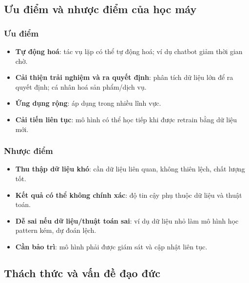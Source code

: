 \subsection{Ưu điểm và nhược điểm của học máy}

\subsubsection{Ưu điểm}
\begin{phuongphap}[title={Advantages of Machine Learning}]
\begin{itemize}
  \item \textbf{Tự động hoá}: tác vụ lặp có thể tự động hoá; ví dụ chatbot giảm thời gian chờ.
  \item \textbf{Cải thiện trải nghiệm và ra quyết định}: phân tích dữ liệu lớn để ra quyết định; cá nhân hoá sản phẩm/dịch vụ.
  \item \textbf{Ứng dụng rộng}: áp dụng trong nhiều lĩnh vực.
  \item \textbf{Cải tiến liên tục}: mô hình có thể học tiếp khi được retrain bằng dữ liệu mới.
\end{itemize}
\end{phuongphap}

\subsubsection{Nhược điểm}
\begin{phuongphap}[title={Disadvantages of Machine Learning}]
\begin{itemize}
  \item \textbf{Thu thập dữ liệu khó}: cần dữ liệu liên quan, không thiên lệch, chất lượng tốt.
  \item \textbf{Kết quả có thể không chính xác}: độ tin cậy phụ thuộc dữ liệu và thuật toán.
  \item \textbf{Dễ sai nếu dữ liệu/thuật toán sai}: ví dụ dữ liệu nhỏ làm mô hình học pattern kém, dự đoán lệch.
  \item \textbf{Cần bảo trì}: mô hình phải được giám sát và cập nhật liên tục.
\end{itemize}
\end{phuongphap}

\subsection{Thách thức và vấn đề đạo đức}

